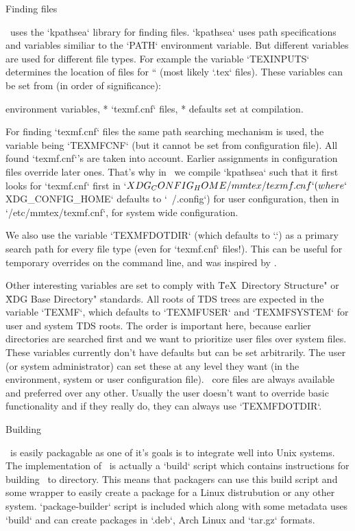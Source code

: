 \sec Finding files

\LuaTeX\ uses the `kpathsea` library for finding files. `kpathsea` uses path
specifications and variables similiar to the `PATH` environment variable. But
different variables are used for different file types. For example the variable
`TEXINPUTS` determines the location of files for `` (most likely `.tex`
files). These variables can be set from (in order of significance):

\begitems * environment variables, * `texmf.cnf` files, * defaults set at
compilation. \enditems

For finding `texmf.cnf` files the same path searching mechanism is used, the
variable being `TEXMFCNF` (but it cannot be set from configuration file). All
found `texmf.cnf`'s are taken into account. Earlier assignments in
configuration files override later ones. That's why in \MMTeX\ we compile
`kpathsea` such that it first looks for `texmf.cnf` first in
`$XDG_CONFIG_HOME/mmtex/texmf.cnf` (where `$XDG_CONFIG_HOME` defaults to
`~/.config`) for user configuration, then in `/etc/mmtex/texmf.cnf`, for system
wide configuration.

We also use the variable `TEXMFDOTDIR` (which defaults to `.`) as a primary
search path for every file type (even for `texmf.cnf` files!). This can be
useful for temporary overrides on the command line, and was inspired by
\TeXLive.

Other interesting variables are set to comply with \"\TeX\ Directory Structure"
or \"XDG Base Directory" standards. All roots of TDS trees are expected in the
variable `TEXMF`, which defaults to `TEXMFUSER` and `TEXMFSYSTEM` for user and
system TDS roots. The order is important here, because earlier directories are
searched first and we want to prioritize user files over system files. These
variables currently don't have defaults but can be set arbitrarily. The user
(or system administrator) can set these at any level they want (in the
environment, system or user configuration file). \MMTeX\ core files are always
available and preferred over any other. Usually the user doesn't want to
override basic functionality and if they really do, they can always use
`TEXMFDOTDIR`.

\sec Building \MMTeX

\MMTeX\ is easily packagable as one of it's goals is to integrate well into
Unix systems. The implementation of \MMTeX\ is actually a `build` script which
contains instructions for building \MMTeX\ to directory. This means that
packagers can use this build script and some wrapper to easily create a package
for a Linux distrubution or any other system. `package-builder` script is
included which along with some metadata uses `build` and can create packages in
`.deb`, Arch Linux and `tar.gz` formats.

